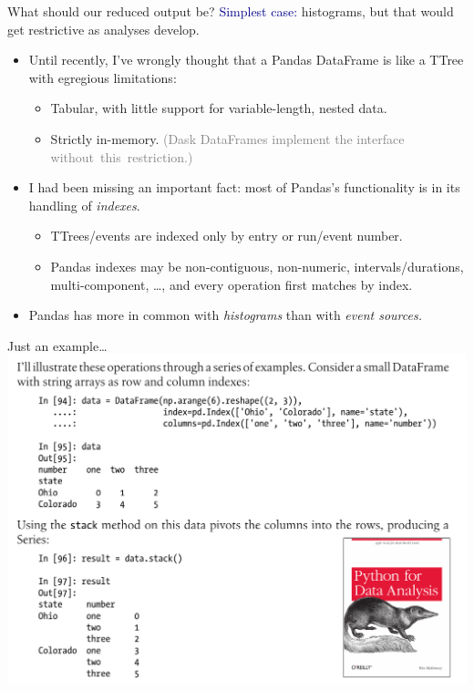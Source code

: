 \documentclass[aspectratio=169]{beamer}
\begin{document}
\begin{frame}{What should our reduced output be?}
\vspace{0.5 cm}
\textcolor{darkblue}{Simplest case:} histograms, but that would get restrictive as analyses develop.

\vspace{0.25 cm}

\vspace{0.5 cm}
\begin{itemize}\setlength{\itemsep}{0.25 cm}
\item<3-> Until recently, I've wrongly thought that a Pandas DataFrame is like a TTree with egregious limitations:
\begin{itemize}
\item Tabular, with little support for variable-length, nested data.
\item Strictly in-memory. \textcolor{gray}{(Dask DataFrames implement the interface \mbox{without this restriction.)\hspace{-1 cm}}}
\end{itemize}
\item<4-> I had been missing an important fact: most of Pandas's functionality is in its handling of {\it indexes}.
\begin{itemize}
\item TTrees/events are indexed only by entry or run/event number.
\item Pandas indexes may be non-contiguous, non-numeric, intervals/durations, multi-component, \ldots, and every operation first matches by index.
\end{itemize}
\item<5-> Pandas has more in common with {\it histograms} than with {\it event sources.}
\end{itemize}
\end{frame}

\begin{frame}{Just an example\ldots}
\vspace{0.25 cm}
\mbox{ } \hfill \includegraphics[width=0.78\linewidth]{pandas-book.png} \hfill \mbox{ }
\end{frame}
\end{document}
